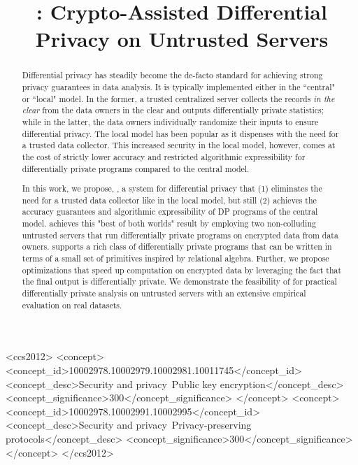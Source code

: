 \documentclass[sigconf]{acmart}
\begin{document}
\title{\system: Crypto-Assisted Differential Privacy on Untrusted Servers}
\author{}
\begin{abstract}
Differential privacy has steadily become the de-facto standard for achieving strong privacy guarantees in data analysis. It is typically implemented either in the ``central" or ``local" model. In the former, a trusted centralized server collects the records \textit{in the clear} from the data owners in the clear and outputs differentially private statistics; while in the latter, the data owners individually randomize their inputs to ensure differential privacy.  The local model has been popular as it dispenses with the need for a trusted data collector. This increased security in the local model, however, comes at the cost of strictly lower accuracy and restricted algorithmic expressibility for differentially private programs compared to the central model. 

In this work, we propose, \system, a  system for differential privacy that (1) eliminates the need for a trusted data collector like in the local model, but still (2) achieves the accuracy guarantees and algorithmic expressibility of DP programs of the central model. \system achieves this "best of both worlds" result by employing two non-colluding untrusted servers that run differentially private programs on encrypted data from data owners. \system 
supports a rich class of differentially private programs that can be written in terms of a small set of primitives inspired by relational algebra. Further, we propose optimizations that speed up computation on encrypted data by leveraging the fact that the final output is differentially private. We demonstrate the feasibility of \system for practical differentially private analysis on untrusted servers with an extensive empirical evaluation on real datasets.
\end{abstract}
\begin{CCSXML}
<ccs2012>
<concept>
<concept_id>10002978.10002979.10002981.10011745</concept_id>
<concept_desc>Security and privacy~Public key encryption</concept_desc>
<concept_significance>300</concept_significance>
</concept>
<concept>
<concept_id>10002978.10002991.10002995</concept_id>
<concept_desc>Security and privacy~Privacy-preserving protocols</concept_desc>
<concept_significance>300</concept_significance>
</concept>
</ccs2012>
\end{CCSXML}
\end{document}
